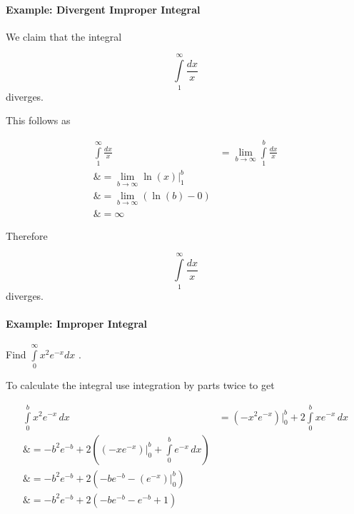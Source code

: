 \paragraph{Example: Divergent Improper Integral}



We claim that the integral



$$\int\limits_1^\infty \frac{dx}{x}$$ diverges.



This follows as



\begin{align}
\int\limits _1^\infty\frac{dx}{x} 

&= \lim _{b\to\infty}\int\limits _1^b \frac{dx}{x} \\\&= \lim _{b\to\infty}\ln(x)\Bigr| _1^b \\\&= \lim _{b\to\infty}\left(\ln(b) - 0\right) \\\&= \infty
\end{align}





Therefore



$$\int\limits _1^\infty\frac{dx}{x}$$ diverges.



\paragraph{Example: Improper Integral}



Find $\int\limits _0^\infty x^2e^{-x}dx$ .



To calculate the integral use integration by parts twice to get



\begin{align}
\int\limits _0^b x^2e^{-x}\,dx 

&= (-x^2e^{-x})\Bigr| _0^b + 2\int\limits _0^b xe^{-x}\,dx \\\&= -b^2e^{-b} + 2\left((-xe^{-x})\Bigr| _0^b + \int\limits _0^b e^{-x}\,dx\right) \\\&= -b^2e^{-b} + 2\left(-be^{-b} - (e^{-x})\Bigr| _0^b\right) \\\&= -b^2e^{-b} + 2\left(-be^{-b} - e^{-b} + 1\right)
\end{align}





